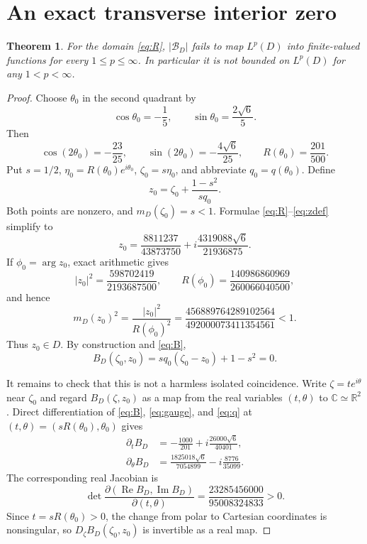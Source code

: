 \documentclass[11pt]{article}
\newtheorem{theorem}{Theorem}
\newcommand{\C}{\mathbb C}
\newcommand{\R}{\mathbb R}
\newcommand{\Rea}{\operatorname{Re}}
\newcommand{\Ima}{\operatorname{Im}}
\begin{document}
\section{An exact transverse interior zero}

\begin{theorem}\label{thm:main}
For the domain \eqref{eq:R}, $|\mathcal B_D|$ fails to map $L^p(D)$ into
finite-valued functions for every $1\le p\le\infty$.  In particular it is
not bounded on $L^p(D)$ for any $1<p<\infty$.
\end{theorem}

\begin{proof}
Choose $\theta_0$ in the second quadrant by
\begin{equation}\label{eq:theta}
 \cos\theta_0=-\frac15,
 \qquad \sin\theta_0=\frac{2\sqrt6}{5}.
\end{equation}
Then
\[
 \cos(2\theta_0)=-\frac{23}{25},\qquad
 \sin(2\theta_0)=-\frac{4\sqrt6}{25},\qquad
 R(\theta_0)=\frac{201}{500}.
\]
Put $s=1/2$, $\eta_0=R(\theta_0)e^{i\theta_0}$,
$\zeta_0=s\eta_0$, and abbreviate $q_0=q(\theta_0)$.  Define
\begin{equation}\label{eq:zdef}
 z_0=\zeta_0+\frac{1-s^2}{s q_0}.
\end{equation}
Both points are nonzero, and $m_D(\zeta_0)=s<1$.  Formulae
\eqref{eq:R}--\eqref{eq:zdef} simplify to
\begin{equation}\label{eq:zexact}
 z_0=\frac{8811237}{43873750}
   +i\frac{4319088\sqrt6}{21936875}.
\end{equation}
If $\phi_0=\arg z_0$, exact arithmetic gives
\begin{equation}\label{eq:inside}
 |z_0|^2=\frac{598702419}{2193687500},\qquad
 R(\phi_0)=\frac{140986860969}{260066040500},
\end{equation}
and hence
\begin{equation}\label{eq:mz}
 m_D(z_0)^2
 =\frac{|z_0|^2}{R(\phi_0)^2}
 =\frac{456889764289102564}{492000073411354561}<1.
\end{equation}
Thus $z_0\in D$.  By construction and \eqref{eq:B},
\[
 B_D(\zeta_0,z_0)
 =s q_0(\zeta_0-z_0)+1-s^2=0.
\]

It remains to check that this is not a harmless isolated coincidence.  Write
$\zeta=te^{i\theta}$ near $\zeta_0$ and regard $B_D(\zeta,z_0)$ as a map
from the real variables $(t,\theta)$ to $\C\simeq\R^2$.  Direct
differentiation of \eqref{eq:B}, \eqref{eq:gauge}, and \eqref{eq:q} at
$(t,\theta)=(sR(\theta_0),\theta_0)$ gives
\begin{align*}
 \partial_t B_D
 &=-\frac{1000}{201}
   +i\frac{26000\sqrt6}{40401},\\
 \partial_\theta B_D
 &=\frac{1825018\sqrt6}{7054899}
   -i\frac{8776}{35099}.
\end{align*}
The corresponding real Jacobian is
\begin{equation}\label{eq:jac}
 \det\frac{\partial(\Rea B_D,\Ima B_D)}{\partial(t,\theta)}
 =\frac{23285456000}{95008324833}>0.
\end{equation}
Since $t=sR(\theta_0)>0$, the change from polar to Cartesian coordinates is
nonsingular, so $D_\zeta B_D(\zeta_0,z_0)$ is invertible as a real map.


\end{proof}
\end{document}
